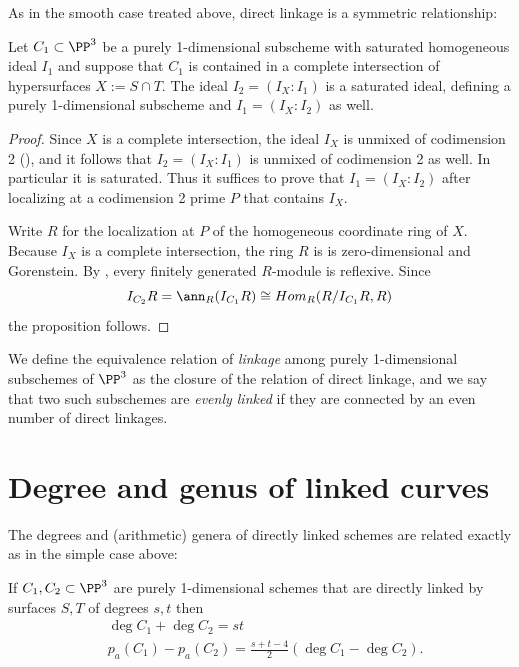As in the smooth case treated above, direct linkage is a symmetric relationship:
\begin{proposition}\label{link unmixed}
Let $C_1\subset \PP^3$ be a purely 1-dimensional subscheme with saturated homogeneous ideal $I_1$ and suppose that $C_1$ is contained in a complete intersection of
hypersurfaces $X := S\cap T$. The ideal $I_2 = (I_{X}:I_1)$ is a saturated ideal, defining a purely 1-dimensional subscheme and 
$I_1 = (I_{X}: I_2)$ as well.
\end{proposition}
 
\begin{proof}
Since $X$ is a complete intersection, the ideal $I_{X}$ is unmixed of codimension 2
(\cite[Proposition 18.13]{Eisenbud1995}), and it follows
that $I_2 = (I_{X}:I_1)$ is unmixed of codimension 2 as well. In particular it is saturated.
Thus it suffices to prove that $I_1 = (I_{X}: I_2)$ after localizing at a codimension 2 prime $P$
that contains $I_{X}$. 

Write $R$ for the localization at $P$ of the homogeneous coordinate ring of $X$. 
Because $I_{X}$ is a complete intersection, the ring $R$ is
 is zero-dimensional and Gorenstein.
By \cite[Propositions 21.1 and 21.5]{Eisenbud1995}, every finitely generated $R$-module is reflexive. Since 
$$
I_{C_2}R= \ann_{R}(I_{C_1}R) \cong Hom_R(R/I_{C_1}R, R)
$$
the proposition follows.
\end{proof}

We define the equivalence relation of \emph{linkage} among purely 1-dimensional subschemes of $\PP^{3}$ as the
closure of the relation of direct linkage, and we say that two such subschemes are \emph{evenly linked}
if they are connected by an even number of direct linkages.

\section{Degree and genus of linked curves}

The degrees and (arithmetic) genera 
of directly linked schemes are related exactly as in the simple case above:

\begin{theorem}\label{direct linkage}\label{linked genus formula}
If $C_1,{C_2}\subset \PP^3$ are purely 1-dimensional schemes that are directly linked by surfaces $S,T$ of degrees $s,t$  then 
$$
\begin{aligned}
&\deg C_1+\deg C_2 = st\\
&p_a(C_1) - p_a({C_2}) = \frac{s+t-4}{2}(\deg C_1-\deg {C_2}).
\end{aligned}
 $$
\end{theorem}

